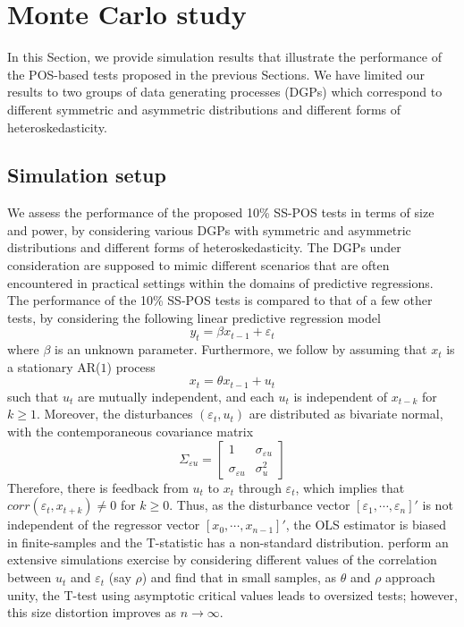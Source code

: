 \documentclass[harvard,11pt]{article}
\begin{document}
\section{Monte Carlo study \label{sec: Monte Carlo studyC1}}

In this Section, we provide simulation results that illustrate the performance
of the POS-based tests proposed in the previous Sections. We have limited our
results to two groups of data generating processes (DGPs) which correspond
to different symmetric and asymmetric distributions and different forms of
heteroskedasticity.

\subsection{Simulation setup \label{sec: Simulated models}}

 We assess the performance of the proposed 10\% SS-POS tests in terms of size and power, by considering various DGPs with symmetric and asymmetric distributions and different forms of heteroskedasticity. The DGPs under consideration are supposed to mimic different scenarios that are often encountered in practical settings within the domains of predictive regressions. The performance of the 10\% SS-POS tests is compared to that of a few other tests, by considering the following linear predictive regression model
\begin{equation}
y_{t}=\beta x_{t-1}+\varepsilon _{t}  \label{DGP}
\end{equation}%
where $\beta $ is an unknown parameter. Furthermore, we follow \citet{mankiw1986we} by assuming that $x_{t}$ is a stationary AR($1$) process 
\begin{equation}\label{x}
x_{t}=\theta x_{t-1}+u_{t}
\end{equation}%
such that $u_t$ are mutually independent, and each $u_t$ is independent of $x_{t-k}$ for $k\geq 1$. Moreover, the disturbances $(\varepsilon_t,u_t)$ are distributed as bivariate normal, with the contemporaneous covariance matrix
\[
\Sigma_{\varepsilon u}=
\begin{bmatrix}
1&\sigma_{\varepsilon u}\\
\sigma_{\varepsilon u}&\sigma^2_{u}
\end{bmatrix}
\]
Therefore, there is feedback from $u_t$ to $x_t$ through $\varepsilon_t$, which implies that $corr(\varepsilon_t,x_{t+k})\neq 0$ for $k\geq0$. Thus, as the disturbance vector $[\varepsilon_1,\cdots,\varepsilon_n]'$ is not independent of the regressor vector $[x_0,\cdots,x_{n-1}]'$, the OLS estimator is biased in finite-samples and the T-statistic has a non-standard distribution. \citet{mankiw1986we} perform an extensive simulations exercise by considering different values of the correlation between $u_t$ and $\varepsilon_t$ (say $\rho$) and find that in small samples, as $\theta$ and $\rho$ approach unity, the T-test using asymptotic critical values leads to oversized tests; however, this size distortion improves as $n\rightarrow \infty$.
\end{document}
